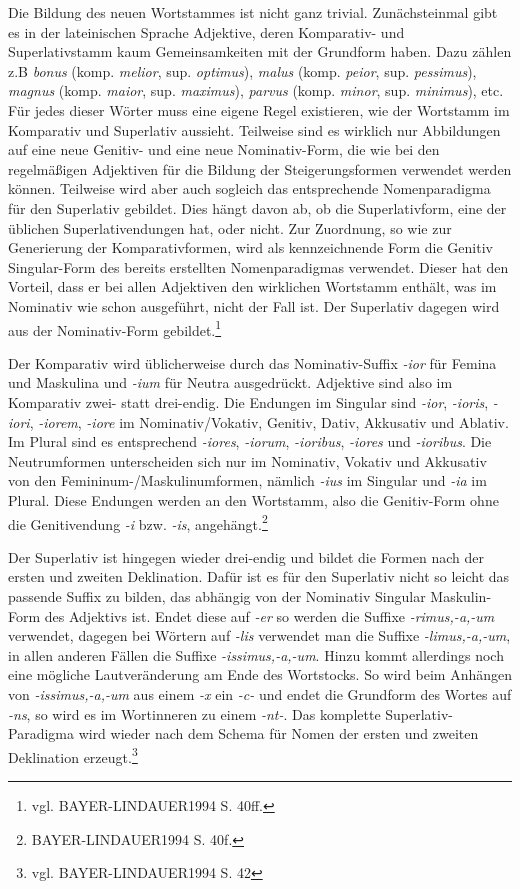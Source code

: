 \documentclass[12pt,abstract=on,titlepage,bibliography=totoc,ngerman,listof=totoc]{scrreprt}
\begin{document}
Die Bildung des neuen Wortstammes ist nicht ganz trivial. Zunächsteinmal gibt es in der lateinischen Sprache Adjektive, deren Komparativ- und Superlativstamm kaum Gemeinsamkeiten mit der Grundform haben. Dazu zählen z.B \textit{bonus} (komp. \textit{melior}, sup. \textit{optimus}), \textit{malus} (komp. \textit{peior}, sup. \textit{pessimus}), \textit{magnus} (komp. \textit{maior}, sup. \textit{maximus}), \textit{parvus} (komp. \textit{minor}, sup. \textit{minimus}), etc. Für jedes dieser Wörter muss eine eigene Regel existieren, wie der Wortstamm im Komparativ und Superlativ aussieht. Teilweise sind es wirklich nur Abbildungen auf eine neue Genitiv- und eine neue Nominativ-Form, die wie bei den regelmäßigen Adjektiven für die Bildung der Steigerungsformen verwendet werden können. Teilweise wird aber auch sogleich das entsprechende Nomenparadigma für den Superlativ gebildet. Dies hängt davon ab, ob die Superlativform, eine der üblichen Superlativendungen hat, oder nicht. Zur Zuordnung, so wie zur Generierung der Komparativformen, wird als kennzeichnende Form die Genitiv Singular-Form des bereits erstellten Nomenparadigmas verwendet. Dieser hat den Vorteil, dass er bei allen Adjektiven den wirklichen Wortstamm enthält, was im Nominativ wie schon ausgeführt, nicht der Fall ist. Der Superlativ dagegen wird aus der Nominativ-Form gebildet.\footnote{vgl. BAYER-LINDAUER1994 S. 40ff.} \par
Der Komparativ wird üblicherweise durch das Nominativ-Suffix \textit{-ior} für Femina und Maskulina und \textit{-ium} für Neutra ausgedrückt. Adjektive sind also im Komparativ zwei- statt drei-endig. Die Endungen im Singular sind \textit{-ior}, \textit{-ioris}, \textit{-iori}, \textit{-iorem}, \textit{-iore} im Nominativ/Vokativ, Genitiv, Dativ, Akkusativ und Ablativ. Im Plural sind es entsprechend \textit{-iores}, \textit{-iorum}, \textit{-ioribus}, \textit{-iores} und \textit{-ioribus}. Die Neutrumformen unterscheiden sich nur im Nominativ, Vokativ und Akkusativ von den Femininum-/Maskulinumformen, nämlich \textit{-ius} im Singular und \textit{-ia} im Plural. Diese Endungen werden an den Wortstamm, also die Genitiv-Form ohne die Genitivendung \textit{-i} bzw. \textit{-is}, angehängt.\footnote{BAYER-LINDAUER1994 S. 40f.} \par
Der Superlativ ist hingegen wieder drei-endig und bildet die Formen nach der ersten und zweiten Deklination. Dafür ist es für den Superlativ nicht so leicht das passende Suffix zu bilden, das abhängig von der Nominativ Singular Maskulin-Form des Adjektivs ist. Endet diese auf \textit{-er} so werden die Suffixe \textit{-rimus,-a,-um} verwendet, dagegen bei Wörtern auf \textit{-lis} verwendet man die Suffixe \textit{-limus,-a,-um}, in allen anderen Fällen die Suffixe \textit{-issimus,-a,-um}. Hinzu kommt allerdings noch eine mögliche Lautveränderung am Ende des Wortstocks. So wird beim Anhängen von \textit{-issimus,-a,-um} aus einem \textit{-x} ein \textit{-c-} und endet die Grundform des Wortes auf \textit{-ns}, so wird es im Wortinneren zu einem \textit{-nt-}. Das komplette Superlativ-Paradigma wird wieder nach dem Schema für Nomen der ersten und zweiten Deklination erzeugt.\footnote{vgl. BAYER-LINDAUER1994 S. 42} \par
\end{document}

